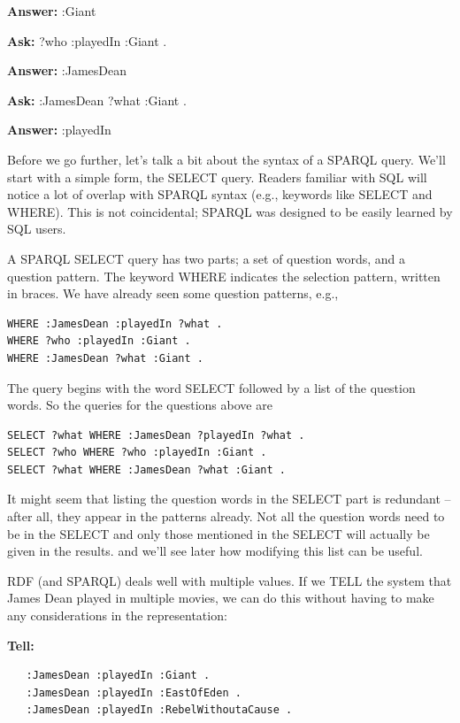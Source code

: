 \textbf{\textbf{Answer:}} :Giant

\textbf{\textbf{Ask:}} ?who :playedIn :Giant .

\textbf{\textbf{Answer:}} :JamesDean

\textbf{\textbf{Ask:}} :JamesDean ?what :Giant .

\textbf{\textbf{Answer:}} :playedIn

Before we go further, let's talk a bit about the syntax of a SPARQL
query. We'll start with a simple form, the SELECT query. Readers
familiar with SQL will notice a lot of overlap with SPARQL syntax (e.g.,
keywords like SELECT and WHERE). This is not coincidental; SPARQL was
designed to be easily learned by SQL users.

A SPARQL SELECT query has two parts; a set of question words, and a
question pattern. The keyword WHERE indicates the selection pattern,
written in braces. We have already seen some question patterns, e.g.,

\begin{lstlisting}
WHERE :JamesDean :playedIn ?what .
WHERE ?who :playedIn :Giant .
WHERE :JamesDean ?what :Giant .
\end{lstlisting}

The query begins with the word SELECT followed by a list of the question
words. So the queries for the questions above are

\begin{lstlisting}
SELECT ?what WHERE :JamesDean ?playedIn ?what .
SELECT ?who WHERE ?who :playedIn :Giant .
SELECT ?what WHERE :JamesDean ?what :Giant .
\end{lstlisting}

It might seem that listing the question words in the SELECT part is
redundant -- after all, they appear in the patterns already. Not all the
question words need to be in the SELECT and only those mentioned in the
SELECT will actually be given in the results. and we'll see later how
modifying this list can be useful.

RDF (and SPARQL) deals well with multiple values. If we TELL the system
that James Dean played
in multiple movies, we can do this without having to make any
considerations in the representation:

\textbf{Tell:}
\begin{lstlisting}
   :JamesDean :playedIn :Giant .
   :JamesDean :playedIn :EastOfEden .
   :JamesDean :playedIn :RebelWithoutaCause .
\end{lstlisting}


